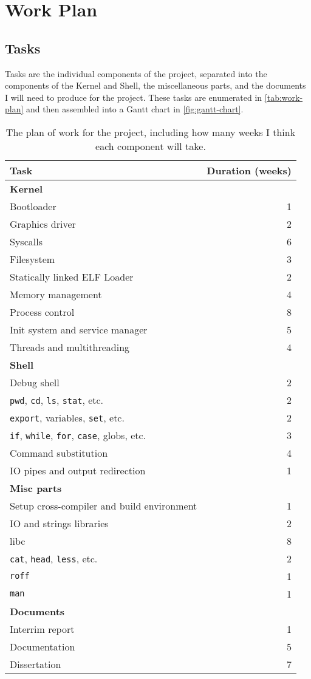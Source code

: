 \documentclass{article}
\begin{document}
\section{Work Plan}
\subsection*{Tasks}
Tasks are the individual components of the project, separated into the
components of the Kernel and Shell, the miscellaneous parts, and the documents
I will need to produce for the project. These tasks are enumerated in
\autoref{tab:work-plan} and then assembled into a Gantt chart in
\autoref{fig:gantt-chart}.
\begin{table}[tbp]
\begin{center}
\begin{tabular}{|l|r|}
    \hline
    Task & Duration (weeks)\\
    \hline \textbf{Kernel} &\\
    Bootloader & 1\\
    Graphics driver & 2\\
    Syscalls & 6\\
    Filesystem & 3\\
    Statically linked ELF Loader & 2\\
    Memory management & 4\\
    Process control & 8\\
    Init system and service manager & 5\\
    Threads and multithreading & 4\\
    \hline \textbf{Shell} &\\
    Debug shell & 2\\
    \texttt{pwd}, \texttt{cd}, \texttt{ls}, \texttt{stat}, etc. & 2\\
    \texttt{export}, variables, \texttt{set}, etc. & 2\\
    \texttt{if}, \texttt{while}, \texttt{for}, \texttt{case}, globs, etc. & 3\\
    Command substitution & 4\\
    IO pipes and output redirection & 1\\
    \hline \textbf{Misc parts} &\\
    Setup cross-compiler and build environment & 1\\
    IO and strings libraries & 2\\
    libc & 8\\
    \texttt{cat}, \texttt{head}, \texttt{less}, etc. & 2\\
    \texttt{roff} & 1\\
    \texttt{man} & 1\\
    \hline \textbf{Documents} &\\
    Interrim report & 1\\
    Documentation & 5\\
    Dissertation & 7\\
    \hline
\end{tabular}
\caption{The plan of work for the project, including how many weeks I think
each component will take.}
\label{tab:work-plan}
\end{center}
\end{table}
\end{document}
